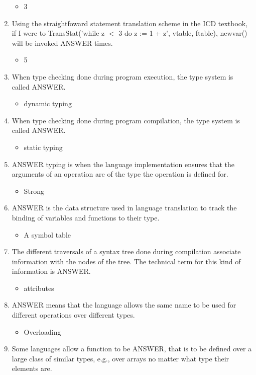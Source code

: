 \documentclass{exam}
\begin{document}
\begin{enumerate}
\begin{itemize}
\item 3
\end{itemize}
\item Using the straightfoward statement translation scheme in the ICD textbook, if I were to TransStat('while z $<$ 3 do z := 1 + z', vtable, ftable), newvar() will be invoked ANSWER times.
\begin{itemize}
\item 5
\end{itemize}
\item When type checking done during program execution, the type system is called ANSWER.
\begin{itemize}
\item dynamic typing
\end{itemize}
\item When type checking done during program compilation, the type system is called ANSWER.
\begin{itemize}
\item static typing
\end{itemize}
\item ANSWER typing is when the language implementation ensures that the arguments of an operation are of the type the operation is defined for.
\begin{itemize}
\item Strong
\end{itemize}
\item ANSWER is the data structure used in language translation to track the binding of variables and functions to their type.
\begin{itemize}
\item A symbol table
\end{itemize}
\item The different traversals of a syntax tree done during compilation associate information with the nodes of the tree.  The technical term for this kind of information is ANSWER.
\begin{itemize}
\item attributes
\end{itemize}
\item ANSWER means that the language allows the same name to be used for different operations over different types.
\begin{itemize}
\item Overloading
\end{itemize}
\item Some languages allow a function to be ANSWER, that is to be defined over a large class of similar types, e.g., over arrays no matter what type their elements are.

\end{enumerate}
\end{document}
